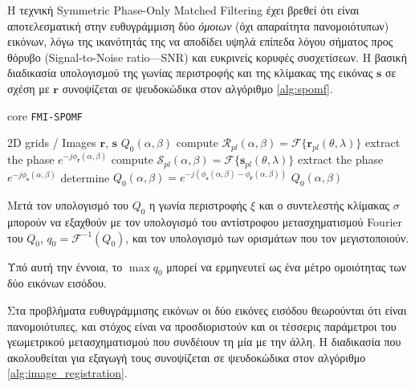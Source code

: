 Η τεχνική Symmetric Phase-Only Matched Filtering \cite{Qin-ShengChen1994a} έχει
βρεθεί ότι είναι αποτελεσματική στην ευθυγράμμιση δύο \textit{όμοιων} (όχι
απαραίτητα πανομοιότυπων) εικόνων, λόγω της ικανότητάς της να αποδίδει υψηλά
επίπεδα λόγου σήματος προς θόρυβο (Signal-to-Noise ratio---SNR) και ευκρινείς
κορυφές συσχετίσεων. Η βασική διαδικασία υπολογισμού της γωνίας περιστροφής και
της κλίμακας της εικόνας $\bm{s}$ σε σχέση με $\bm{r}$ συνοψίζεται σε
ψευδοκώδικα στον αλγόριθμο \ref{alg:spomf}.

\begin{algorithm}
  \caption{core \texttt{FMI-SPOMF}}
  \begin{spacing}{1.2}
  \begin{algorithmic}[1]
    \REQUIRE 2D grids / Images $\bm{r}$, $\bm{s}$
    \ENSURE $Q_0(\alpha,\beta)$
    \STATE compute $\mathcal{R}_{pl}(\alpha,\beta) = \mathcal{F}\{\bm{r}_{pl}(\theta,\lambda)\}$
    \STATE extract the phase $e^{-j\phi_{\bm{r}}(\alpha, \beta)}$
    \STATE compute $\mathcal{S}_{pl}(\alpha,\beta) = \mathcal{F}\{\bm{s}_{pl}(\theta,\lambda)\}$
    \STATE extract the phase $e^{-j\phi_{\bm{s}}(\alpha, \beta)}$
    \STATE determine $Q_0(\alpha, \beta) = e^{-j(\phi_{\bm{s}}(\alpha, \beta)-\phi_{\bm{r}}(\alpha, \beta))}$
    \RETURN $Q_0(\alpha,\beta)$
  \end{algorithmic}
  \end{spacing}
  \label{alg:spomf}
\end{algorithm}
Μετά τον υπολογισμό του $Q_0$ η γωνία περιστροφής $\xi$ και ο συντελεστής
κλίμακας $\sigma$ μπορούν να εξαχθούν με τον υπολογισμό του αντίστροφου
μετασχηματισμού Fourier του $Q_0$, $q_0 = \mathcal{F}^{-1}(Q_0)$, και τον
υπολογισμό των ορισμάτων που τον μεγιστοποιούν.

\begin{gg_box}
  \begin{remark}
    \label{remark:01_01_02:q0_similarity_measure}
    Υπό αυτή την έννοια, το $\max q_0$ μπορεί να ερμηνευτεί ως ένα μέτρο
    ομοιότητας των δύο εικόνων εισόδου.
  \end{remark}
\end{gg_box}

Στα προβλήματα ευθυγράμμισης εικόνων οι δύο εικόνες εισόδου θεωρούνται ότι
είναι πανομοιότυπες, και στόχος είναι να προσδιοριστούν και οι τέσσερις
παράμετροι του γεωμετρικού μετασχηματισμού που συνδέιουν τη μία με την άλλη. Η
διαδικασία που ακολουθείται για εξαγωγή τους συνοψίζεται σε ψευδοκώδικα
στον αλγόριθμο \ref{alg:image_registration}.

